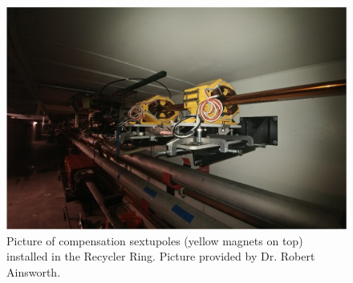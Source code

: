 \begin{figure}[H]
   \centering
   \includegraphics[width=\columnwidth]{chapter3/sextupoles.png}
   \caption{Picture of compensation sextupoles (yellow magnets on top) installed in the Recycler Ring. Picture provided by Dr. Robert Ainsworth.}
   \label{fig:sextupoles}
   \vspace{-1.25em}
\end{figure}